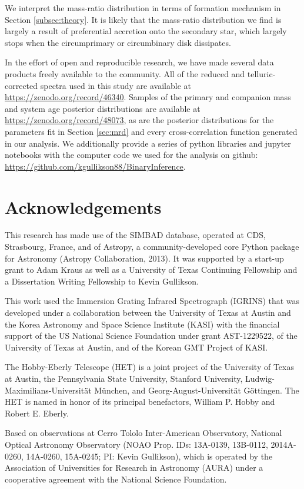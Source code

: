 \documentclass{emulateapj}
\begin{document}
We interpret the mass-ratio distribution in terms of formation mechanism in Section \ref{subsec:theory}. It is likely that the mass-ratio distribution we find is largely a result of preferential accretion onto the secondary star, which largely stops when the circumprimary or circumbinary disk dissipates.

In the effort of open and reproducible research, we have made several data products freely available to the community. All of the reduced and telluric-corrected spectra used in this study are available at \url{https://zenodo.org/record/46340}. Samples of the primary and companion mass and system age posterior distributions are available at \url{https://zenodo.org/record/48073}, as are the posterior distributions for the parameters fit in Section \ref{sec:mrd} and every cross-correlation function generated in our analysis. We additionally provide a series of python libraries and jupyter notebooks with the computer code we used for the analysis on github: \url{https://github.com/kgullikson88/BinaryInference}.




\section*{Acknowledgements}
This research has made use of the SIMBAD database, operated at CDS, Strasbourg, France, and of Astropy, a community-developed core Python package for Astronomy (Astropy Collaboration, 2013).
It was supported by a start-up grant to Adam Kraus as well as a University of Texas Continuing Fellowship and a Dissertation Writing Fellowship to Kevin Gullikson.

This work used the Immersion Grating Infrared Spectrograph (IGRINS) that was developed under a collaboration between the University of Texas at Austin and the Korea Astronomy and Space Science Institute (KASI) with the financial support of the US National Science Foundation under grant AST-1229522, of the University of Texas at Austin, and of the Korean GMT Project of KASI.

The Hobby-Eberly Telescope (HET) is a joint project of the University of Texas at Austin, the Pennsylvania State University, Stanford University, Ludwig-Maximilians-Universit\"at M\"unchen, and Georg-August-Universit\"at G\"ottingen. The HET is named in honor of its principal benefactors, William P. Hobby and Robert E. Eberly.

Based on observations at Cerro Tololo Inter-American Observatory, National Optical Astronomy Observatory (NOAO Prop. IDs: 13A-0139, 13B-0112, 2014A-0260, 14A-0260, 15A-0245; PI: Kevin Gullikson), which is operated by the Association of Universities for Research in Astronomy (AURA) under a cooperative agreement with the National Science Foundation. 
\end{document}
